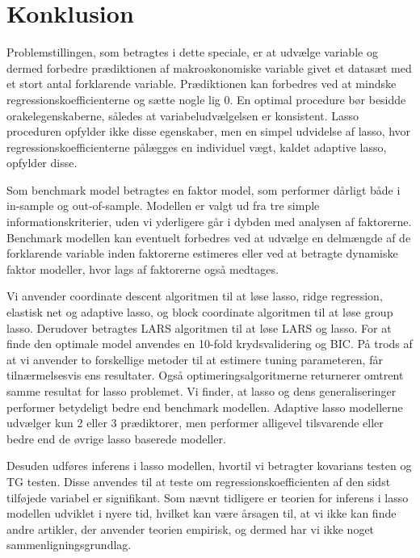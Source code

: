 \chapter{Konklusion}
Problemstillingen, som betragtes i dette speciale, er at udvælge variable og dermed forbedre prædiktionen af makroøkonomiske variable givet et datasæt med et stort antal forklarende variable.
Prædiktionen kan forbedres ved at mindske regressionskoefficienterne og sætte nogle lig 0.
En optimal procedure bør besidde orakelegenskaberne, således at variabeludvælgelsen er konsistent.
Lasso proceduren opfylder ikke disse egenskaber, men en simpel udvidelse af lasso, hvor regressionskoefficienterne pålægges en individuel vægt, kaldet adaptive lasso, opfylder disse.

Som benchmark model betragtes en faktor model, som performer dårligt både i in-sample og out-of-sample.
Modellen er valgt ud fra tre simple informationskriterier, uden vi yderligere går i dybden med analysen af faktorerne.
Benchmark modellen kan eventuelt forbedres ved at udvælge en delmængde af de forklarende variable inden faktorerne estimeres eller ved at betragte dynamiske faktor modeller, hvor lags af faktorerne også medtages.

Vi anvender coordinate descent algoritmen til at løse lasso, ridge regression, elastisk net og adaptive lasso, og block coordinate algoritmen til at løse group lasso.
Derudover betragtes LARS algoritmen til at løse LARS og lasso.
For at finde den optimale model anvendes en 10-fold krydsvalidering og BIC.
På trods af at vi anvender to forskellige metoder til at estimere tuning parameteren, får tilnærmelsesvis ens resultater.
Også optimeringsalgoritmerne returnerer omtrent samme resultat for lasso problemet.
Vi finder, at lasso og dens generaliseringer performer betydeligt bedre end benchmark modellen.
Adaptive lasso modellerne udvælger kun 2 eller 3 prædiktorer, men performer alligevel tilsvarende eller bedre end de øvrige lasso baserede modeller.

Desuden udføres inferens i lasso modellen, hvortil vi betragter kovarians testen og TG testen.
Disse anvendes til at teste om regressionskoefficienten af den sidst tilføjede variabel er signifikant.
Som nævnt tidligere er teorien for inferens i lasso modellen udviklet i nyere tid, hvilket kan være årsagen til, at vi ikke kan finde andre artikler, der anvender teorien empirisk, og dermed har vi ikke noget sammenligningsgrundlag.


